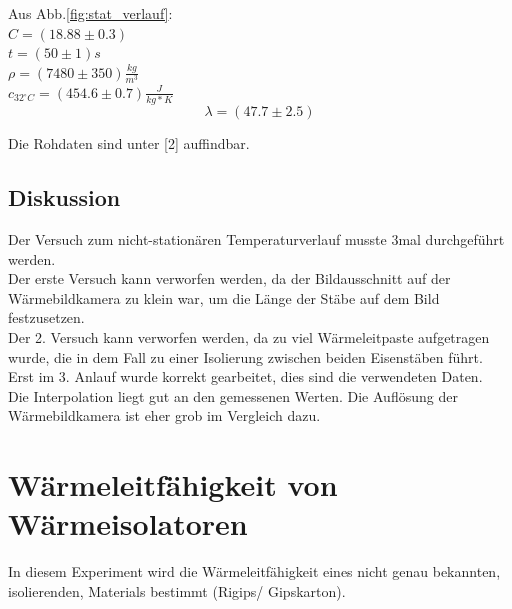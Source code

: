 \documentclass[12pt,a4paper]{article}
\begin{document}
\begin{multicols}{2}

\noindent Aus Abb.\ref{fig:stat_verlauf}:\\
$C=(18.88\pm 0.3)$\\
$t=(50 \pm 1) s$\\
$\rho = (7480 \pm 350)\frac{kg}{m^3}$\\ 
$c_{32^{\circ}C} = (454.6 \pm 0.7)\frac{J}{kg * K}$\\
$$\lambda = (47.7 \pm 2.5)$$

Die Rohdaten sind unter [2] auffindbar.

\subsection{Diskussion}



Der Versuch zum nicht-stationären Temperaturverlauf musste 3mal durchgeführt werden.\\
Der erste Versuch kann verworfen werden, da der Bildausschnitt auf der Wärmebildkamera zu klein war, um die Länge der Stäbe auf dem Bild festzusetzen.\\
Der 2. Versuch kann verworfen werden, da zu viel Wärmeleitpaste aufgetragen wurde, die in dem Fall zu einer Isolierung zwischen beiden Eisenstäben führt.\\
Erst im 3. Anlauf wurde korrekt gearbeitet, dies sind die verwendeten Daten.\\

Die Interpolation liegt gut an den gemessenen Werten. Die Auflösung der Wärmebildkamera ist eher grob im Vergleich dazu.




\section{Wärmeleitfähigkeit von Wärmeisolatoren}
In diesem Experiment wird die Wärmeleitfähigkeit eines nicht genau bekannten, isolierenden, Materials bestimmt (Rigips/ Gipskarton).


\end{multicols}
\end{document}
